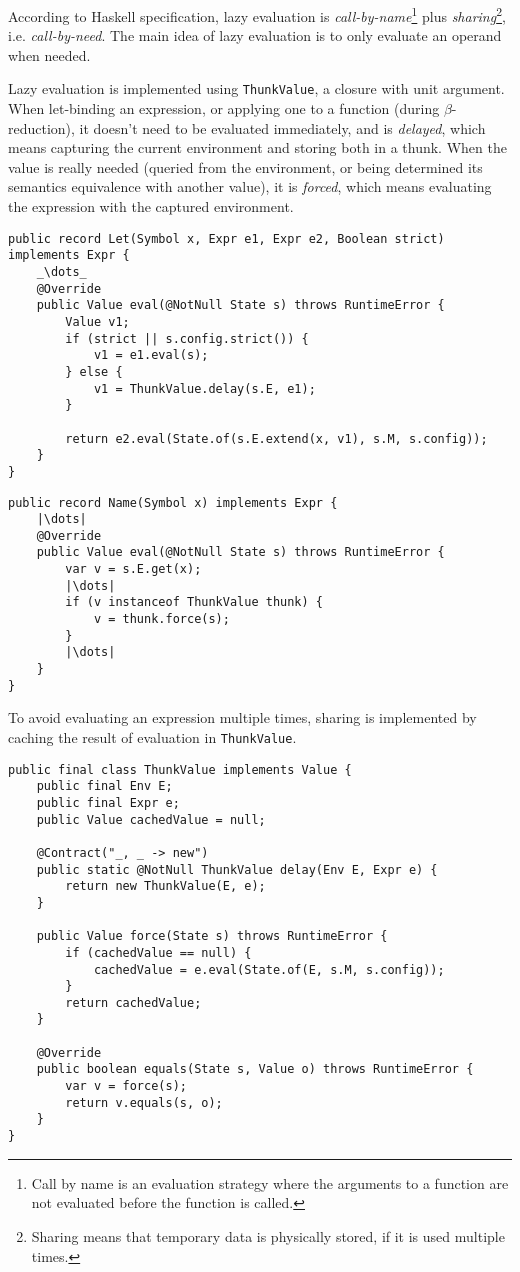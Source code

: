 \documentclass[a4paper]{article}
\begin{document}
According to Haskell specification, lazy evaluation is \textit{call-by-name}\footnote{Call by name is an evaluation strategy where the arguments to a function are not evaluated before the function is called.} plus \textit{sharing}\footnote{Sharing means that temporary data is physically stored, if it is used multiple times.}, i.e. \textit{call-by-need}.  The main idea of lazy evaluation is to only evaluate an operand when needed.

Lazy evaluation is implemented using \texttt{ThunkValue}, a closure with unit argument. When let-binding an expression, or applying one to a function (during $\beta$-reduction), it doesn't need to be evaluated immediately, and is \textit{delayed}, which means capturing the current environment and storing both in a thunk. When the value is really needed (queried from the environment, or being determined its semantics equivalence with another value), it is \textit{forced}, which means evaluating the expression with the captured environment.

\begin{verbatim}
public record Let(Symbol x, Expr e1, Expr e2, Boolean strict) implements Expr {
    _\dots_
    @Override
    public Value eval(@NotNull State s) throws RuntimeError {
        Value v1;
        if (strict || s.config.strict()) {
            v1 = e1.eval(s);
        } else {
            v1 = ThunkValue.delay(s.E, e1);
        }

        return e2.eval(State.of(s.E.extend(x, v1), s.M, s.config));
    }
}
\end{verbatim}

\begin{verbatim}
public record Name(Symbol x) implements Expr {
    |\dots|
    @Override
    public Value eval(@NotNull State s) throws RuntimeError {
        var v = s.E.get(x);
        |\dots|
        if (v instanceof ThunkValue thunk) {
            v = thunk.force(s);
        }
        |\dots|
    }
}
\end{verbatim}

To avoid evaluating an expression multiple times, sharing is implemented by caching the result of evaluation in \texttt{ThunkValue}.

\begin{verbatim}
public final class ThunkValue implements Value {
    public final Env E;
    public final Expr e;
    public Value cachedValue = null;

    @Contract("_, _ -> new")
    public static @NotNull ThunkValue delay(Env E, Expr e) {
        return new ThunkValue(E, e);
    }

    public Value force(State s) throws RuntimeError {
        if (cachedValue == null) {
            cachedValue = e.eval(State.of(E, s.M, s.config));
        }
        return cachedValue;
    }

    @Override
    public boolean equals(State s, Value o) throws RuntimeError {
        var v = force(s);
        return v.equals(s, o);
    }
}
\end{verbatim}
\end{document}
